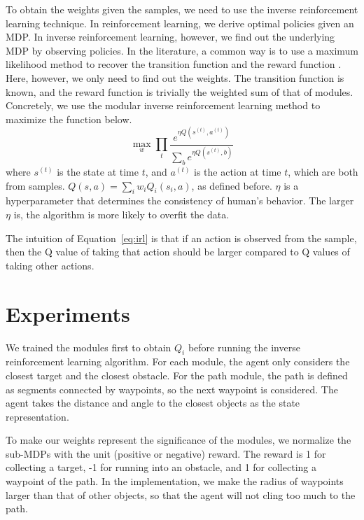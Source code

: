 \documentclass[11pt]{article} %
\begin{document}
To obtain the weights given the samples, we need to use the inverse
reinforcement learning technique. In reinforcement learning, we derive 
optimal policies given an MDP. In inverse reinforcement learning, however, we
find out the underlying MDP by observing policies. In the literature, a common
way is to use a maximum likelihood method to recover the transition function and
the reward function \cite{ng2000algorithms}. Here, however, we only need to find
out the weights. The transition function is known, and the reward function is
trivially the weighted sum of that of modules. Concretely, we use the modular
inverse reinforcement learning method \cite{rothkopf2013modular} to maximize the
function below.
\begin{equation}
\label{eq:irl}
\max_w \prod_t \frac{e^{\eta Q(s^{(t)}, a^{(t)})}}{\sum_b e^{\eta Q(s^{(t)}, b)}}
\end{equation}
where $s^{(t)}$ is the state at time $t$, and $a^{(t)}$ is the action at time
$t$, which are both from samples. $Q(s, a) = \sum_i w_i Q_i(s_i, a)$, as defined
before. $\eta$ is a hyperparameter that determines the consistency of human's
behavior. The larger $\eta$ is, the algorithm is more likely to overfit the data.

The intuition of Equation~\ref{eq:irl} is that if an action is observed from the
sample, then the Q value of taking that action should be larger compared to Q
values of taking other actions.

\section{Experiments}
\label{sec:exp}

We trained the modules first to obtain $Q_i$ before running the inverse reinforcement
learning algorithm. For each module, the agent only considers the closest target
and the closest obstacle. For the path module, the path is defined as segments
connected by waypoints, so the next waypoint is considered. The agent takes the
distance and angle to the closest objects as the state representation.

To make our weights represent the significance of the modules, we
normalize the sub-MDPs with the unit (positive or negative) reward. The reward
is 1 for collecting a target, -1 for running into an obstacle, and 1 for
collecting a waypoint of the path. In the implementation, we make the radius of
waypoints larger than that of other objects, so that the agent will not cling
too much to the path.
\end{document}
